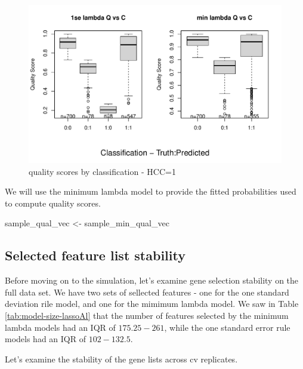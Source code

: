 \documentclass[
]{book}
\newenvironment{Shaded}{\begin{snugshade}}{\end{snugshade}}
\newcommand{\NormalTok}[1]{#1}
\newcommand{\StringTok}[1]{\textcolor[rgb]{0.31,0.60,0.02}{#1}}
\begin{document}
\begin{figure}
\centering
\includegraphics{Static/figures/plot-qual-conf-1.pdf}
\caption{\label{fig:plot-qual-conf}quality scores by classification - HCC=1}
\end{figure}

We will use the minimum lambda model to provide
the fitted probabilities used to compute quality scores.

\begin{Shaded}
\begin{Highlighting}[]
\NormalTok{sample\_qual\_vec <{-}}\StringTok{ }\NormalTok{sample\_min\_qual\_vec}
\end{Highlighting}
\end{Shaded}

\hypertarget{selected-feature-list-stability}{%
\subsection*{Selected feature list stability}\label{selected-feature-list-stability}}

Before moving on to the simulation, let's examine gene selection stability on the
full data set. We have two sets of sellected features - one for the
one standard deviation rile model, and one for the mimimum lambda model.
We saw in Table \ref{tab:model-size-lassoAl} that the number of features
selected by the minimum lambda models had an IQR of
\(175.25-261\),
while the one standard error rule models had an IQR of
\(102-132.5\).

Let's examine the stability of the gene lists across cv replicates.
\end{document}
